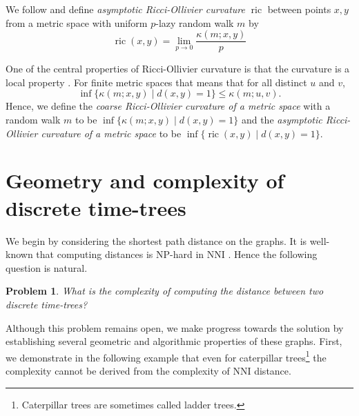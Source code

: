 \documentclass[11pt]{amsart}
\newtheorem{problem}[lemma]{Problem}
\theoremstyle{definition}
\newcommand{\nni}{\mathrm{NNI}}
\newcommand{\ric}{\operatorname{ric}}
\begin{document}
{We follow \textcite{Loisel2014-gu} and define \emph{asymptotic Ricci-Ollivier curvature} $\ric$ between points $x,y$ from a metric space with uniform $p$-lazy random walk $m$ by
\[
\ric(x,y) = \lim_{p\to0} \frac{\kappa(m;x,y)}{p}
\]

One of the central properties of Ricci-Ollivier curvature is that the curvature is a local property \autocite{Ollivier2009-cj}.
For finite metric spaces that means that for all distinct $u$ and $v$,
\[
\inf\{\kappa(m;x,y)\mid d(x,y) = 1\} \leq \kappa(m;u,v).
\]
Hence, we define the \emph{coarse Ricci-Ollivier curvature of a metric space} with a random walk $m$ to be $\inf\{\kappa(m;x,y)\mid d(x,y) = 1\}$ and the \emph{asymptotic Ricci-Ollivier curvature of a metric space} to be $\inf\{\ric(x,y)\mid d(x,y) = 1\}$.
}{}


\section{Geometry and complexity of discrete time-trees}

We begin by considering the shortest path distance on the graphs.
It is well-known that computing distances is NP-hard in $\nni$ \autocite{Dasgupta2000-xa}.
Hence the following question is natural.

\begin{problem}
\label{problemComplexity}
What is the complexity of computing the distance between two discrete time-trees?
\end{problem}

Although this problem remains open, we make progress towards the solution by establishing several geometric and algorithmic properties of these graphs.
First, we demonstrate in the following example that even for caterpillar trees\footnote{
Caterpillar trees are sometimes called ladder trees.}
the complexity cannot be derived from the complexity of $\nni$ distance.
\end{document}
